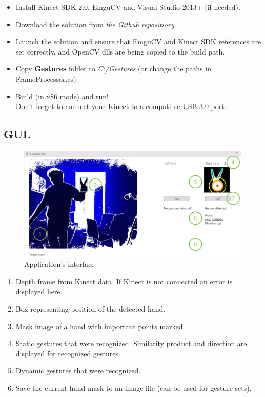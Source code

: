 \documentclass[a4paper,11pt,oneside]{article}
\begin{document}
\begin{itemize}
\item Install Kinect SDK 2.0, EmguCV and Visual Studio 2013+ (if needed).
\item Download the solution from \href{https://github.com/dmitryfd/KinectGR}{\textit{the Github repositiory}}.
\item Launch the solution and ensure that EmguCV and Kinect SDK references are set correctly, and OpenCV dlls are being copied to the build path. 
\item Copy \textbf{Gestures} folder to \textit{C:/Gestures} (or change the paths in FrameProcessor.cs).
\item Build (in x86 mode) and run! \\Don't forget to connect your Kinect to a compatible USB 3.0 port.
\end{itemize}

\subsection{GUI.}

  \begin{figure}[H]
  \centering
  \includegraphics[scale=0.6]{app-gui.png}
\caption{Application's interface}
\end{figure}

\begin{enumerate}
\item Depth frame from Kinect data. If Kinect is not connected an error is displayed here.
\item Box representing position of the detected hand.
\item Mask image of a hand with important points marked.
\item Static gestures that were recognized. Similarity product and direction are displayed for recognized gestures.
\item Dynamic gestures that were recognized.
\item Save the current hand mask to an image file (can be used for gesture sets).
\end{enumerate}
\end{document}
